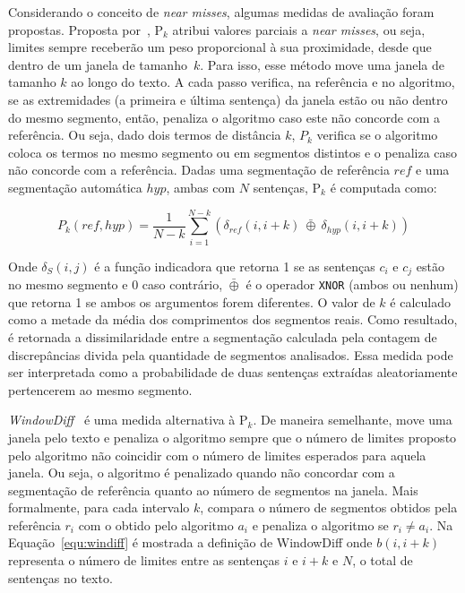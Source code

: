 
Considerando o conceito de \textit{near misses}, algumas medidas de avaliação foram propostas. Proposta por~\cite{Beeferman1999}, P$_k$ atribui valores parciais a \textit{near misses}, ou seja, limites sempre receberão um peso proporcional à sua proximidade, desde que dentro de um janela de tamanho~$k$.  Para isso, esse método move uma janela de tamanho $k$ ao longo do texto. A cada passo verifica, na referência e no algoritmo, se as extremidades (a primeira e última sentença) da janela estão ou não dentro do mesmo segmento, então, penaliza o algoritmo caso este não concorde com a referência. Ou seja, dado dois termos de distância $k$, $P_k$ verifica se o algoritmo coloca os termos no mesmo segmento ou em segmentos distintos e o penaliza caso não concorde com a referência. Dadas uma segmentação de referência $ref$ e uma segmentação automática $hyp$, ambas com $N$ sentenças, P$_k$ é computada como:


\begin{equation}
P_k(ref,hyp) = \frac{1}{N - k}
\sum_{i=1}^{N-k } 
(
\delta_{ref}(i, i+k) ~
\bar{\oplus} ~
\delta_{hyp}(i, i+k) 
)
\label{equ:Pk}
\end{equation}


Onde $\delta_S(i,j)$ é a função indicadora que retorna 1 se as sentenças $c_i$ e $c_j$ estão no mesmo segmento e 0 caso contrário, $\bar{\oplus}$ é o operador \texttt{XNOR} (ambos ou nenhum) que retorna 1 se ambos os argumentos forem diferentes. 
%
%
O valor de $k$ é calculado como a metade da média dos comprimentos dos segmentos reais. Como resultado, é retornada a dissimilaridade entre a segmentação calculada pela contagem de discrepâncias divida pela quantidade de segmentos analisados. Essa medida pode ser interpretada como a probabilidade de duas sentenças extraídas aleatoriamente pertencerem ao mesmo segmento.  





\textit{WindowDiff}~\cite{Pevzner2002} é uma medida alternativa à P$_k$. De maneira semelhante, move uma janela pelo texto e penaliza o algoritmo sempre que o número de limites proposto pelo algoritmo não coincidir com o número de limites esperados para aquela janela. Ou seja, o algoritmo é penalizado quando não concordar com a segmentação de referência quanto ao número de segmentos na janela. Mais formalmente, para cada intervalo $k$, compara o número de segmentos obtidos pela referência $r_i$ com o obtido pelo algoritmo $a_i$ e penaliza o algoritmo se $r_i \neq a_i$. Na Equação~\ref{equ:windiff} é mostrada a definição de WindowDiff onde $b(i, i+k)$ representa o número de limites entre as sentenças $i$ e $i+k$ e $N$, o total de sentenças no texto.

